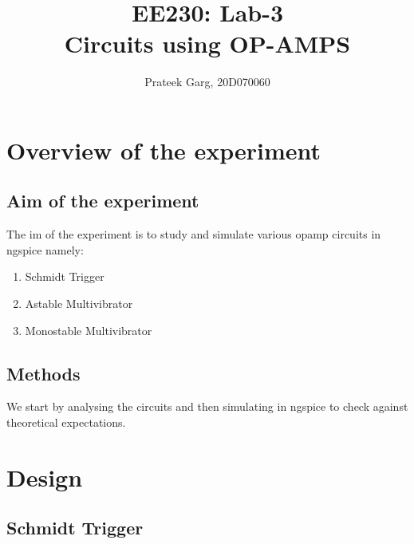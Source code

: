 \documentclass[12pt]{article}
\title{EE230: Lab-3\\
Circuits using OP-AMPS}
\author{Prateek Garg, 20D070060}
\begin{document}
\noindent
\maketitle

\section{Overview of the experiment} %

\subsection{Aim of the experiment}%
The im of the experiment is to study and simulate various opamp circuits in ngspice namely: 
\begin{enumerate}
    \item Schmidt Trigger
    \item Astable Multivibrator
    \item Monostable Multivibrator
\end{enumerate}
\subsection{Methods}
We start by analysing the circuits and then simulating in ngspice to check against theoretical expectations.  
\section{Design}
\subsection{Schmidt Trigger}
\begin{figure}[H]
  \begin{center}
\end{center}
\end{figure}
\end{document}
